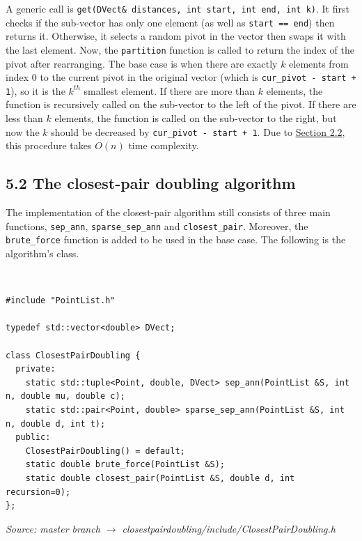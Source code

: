 \documentclass[12pt,english,]{article}
\newcommand{\code}[1]{\colorbox{lbcolor}{\texttt{#1}}}
\begin{document}
A generic call is
\code{get(DVect\& distances, int start, int end, int k)}. It first
checks if the sub-vector has only one element (as well as
\code{start == end}) then returns it. Otherwise, it selects a random
pivot in the vector then swaps it with the last element. Now, the
\code{partition} function is called to return the index of the pivot
after rearranging. The base case is when there are exactly \(k\)
elements from index 0 to the current pivot in the original vector (which
is \code{cur\_pivot - start + 1}), so it is the \(k^{th}\) smallest
element. If there are more than \(k\) elements, the function is
recursively called on the sub-vector to the left of the pivot. If there
are less than \(k\) elements, the function is called on the sub-vector
to the right, but now the \(k\) should be decreased by
\code{cur\_pivot - start + 1}. Due to
\protect\hyperlink{section2.2}{Section 2.2}, this procedure takes
\(O(n)\) time complexity.

\hypertarget{section5.2}{%
\subsection{5.2 The closest-pair doubling algorithm}\label{section5.2}}

The implementation of the closest-pair algorithm still consists of three
main functions, \code{sep\_ann}, \code{sparse\_sep\_ann} and
\code{closest\_pair}. Moreover, the \code{brute\_force} function is
added to be used in the base case. The following is the algorithm's
class.

~

\begin{lstlisting}
#include "PointList.h"

typedef std::vector<double> DVect;

class ClosestPairDoubling {
  private:
    static std::tuple<Point, double, DVect> sep_ann(PointList &S, int n, double mu, double c);
    static std::pair<Point, double> sparse_sep_ann(PointList &S, int n, double d, int t);
  public:
    ClosestPairDoubling() = default;
    static double brute_force(PointList &S);
    static double closest_pair(PointList &S, double d, int recursion=0);
};
\end{lstlisting}
\vspace{-2truemm}
\begin{minipage}{1\textwidth}
  \begin{flushright}
  {\footnotesize \emph{Source: master branch $\rightarrow$ closestpairdoubling/include/ClosestPairDoubling.h}\par}
  \end{flushright}
\end{minipage}
\end{document}
